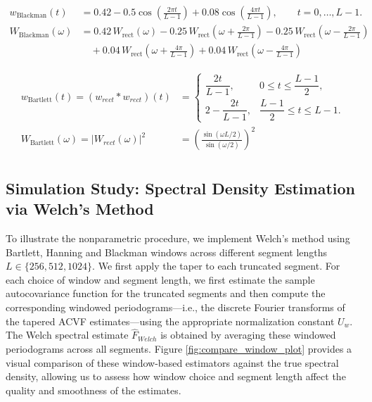 \documentclass[preprint]{aastex}
\theoremstyle{nonitalicname}
\theoremstyle{plain}
\theoremstyle{remark}
\begin{document}
\begin{equation}
    \begin{aligned}
        w_{\mathrm{Blackman}}(t) &=0.42 - 0.5\cos\left(\frac{2\pi t}{L-1}\right) + 0.08\cos\left(\frac{4\pi t}{L-1}\right), \qquad t = 0,\dots,L-1.\\
        W_{\mathrm{Blackman}}(\omega)&=0.42\, W_{\mathrm{rect}}(\omega)- 0.25\, W_{\mathrm{rect}}\!\left(\omega + \tfrac{2\pi}{L-1}\right)
- 0.25\, W_{\mathrm{rect}}\!\left(\omega - \tfrac{2\pi}{L-1}\right) \\[4pt]
&\quad
+ 0.04\, W_{\mathrm{rect}}\!\left(\omega + \tfrac{4\pi}{L-1}\right)
+ 0.04\, W_{\mathrm{rect}}\!\left(\omega - \tfrac{4\pi}{L-1}\right)
    \end{aligned}
\end{equation}


\begin{equation}
\begin{aligned}
    w_{\mathrm{Bartlett}}(t)= (w_{rect} * w_{rect})(t)&= 
\begin{cases}
\dfrac{2t}{L-1}, & 0 \le t \le \dfrac{L-1}{2},\\[6pt]
2 - \dfrac{2t}{L-1}, & \dfrac{L-1}{2} \le t \le L-1.
\end{cases}\\
W_{\mathrm{Bartlett}}(\omega) = \big| W_{rect}(\omega)\big|^2 &= \left(\frac{\sin(\omega L/2)}{\sin(\omega/2)}\right)^2\\
\end{aligned}
\end{equation}

\subsection{Simulation Study: Spectral Density Estimation via Welch’s Method}
To illustrate the nonparametric procedure, we implement Welch’s method using Bartlett, Hanning and Blackman windows across different segment lengths $L \in \{256, 512, 1024\}$. We first apply the taper to each truncated segment. For each choice of window and segment length, we first estimate the sample autocovariance function for the truncated segments and then compute the corresponding windowed periodograms—i.e., the discrete Fourier transforms of the tapered ACVF estimates—using the appropriate normalization constant $U_w$. The Welch spectral estimate $\widehat F_{Welch}$ is obtained by averaging these windowed periodograms across all segments. Figure \ref{fig:compare_window_plot} provides a visual comparison of these window-based estimators against the true spectral density, allowing us to assess how window choice and segment length affect the quality and smoothness of the estimates.
\end{document}

